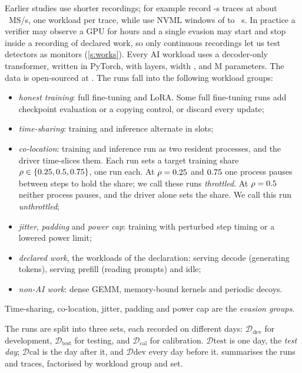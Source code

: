 Earlier studies use shorter recordings; for example \citet{gargiulo2026} record \GkTraceS{}-s traces
at about \GkRateApprox{}~MS/s, one workload per trace, while \citet{rahman2026} use NVML
windows of \RtWinLo{} to \RtWinHi{}~s. In practice a verifier may observe a GPU for hours and a single evasion may start and stop inside a recording of declared work, so only continuous recordings let us test detectors as monitors
(\cref{s:works}). Every AI workload uses a decoder-only transformer, written in PyTorch, with \ModelLayers{} layers, width
\ModelWidth, and \ModelParams{}M parameters. The data is open-sourced at \citet{kimpson2026corpus}. The runs fall into the following workload groups:
\begin{itemize}
  \item \emph{honest training}: full fine-tuning and LoRA. Some full fine-tuning runs add
        checkpoint evaluation or a copying control, or discard every update;
  \item \emph{time-sharing}: training and inference alternate in slots;
  \item \emph{co-location}: training and inference run as two resident processes,
        and the driver time-slices them. Each run sets a target training share
        $\rho \in \{0.25, 0.5, 0.75\}$, one run each. At $\rho = 0.25$
        and $0.75$ one process pauses between steps to hold the share; we call
        these runs \emph{throttled}. At
        $\rho = 0.5$ neither process pauses, and the driver alone sets the share.
        We call this run \emph{unthrottled};
  \item \emph{jitter}, \emph{padding} and \emph{power cap}: training with
        perturbed step timing or a lowered power limit;
  \item \emph{declared work}, the workloads of the declaration: serving decode
        (generating tokens), serving prefill (reading prompts) and idle;
  \item \emph{non-AI work}: dense GEMM, memory-bound kernels and periodic decoys.
\end{itemize}
Time-sharing, co-location, jitter, padding and power cap are the \emph{evasion groups}.

The runs are split into three sets, each recorded on different days: $\mathcal{D}_{\mathrm{dev}}$ for development, $\mathcal{D}_{\mathrm{test}}$ for testing, and $\mathcal{D}_{\mathrm{cal}}$ for calibration. $\mathcal{D}{\mathrm{test}}$ is one day, the \emph{test day}; $\mathcal{D}{\mathrm{cal}}$ is the day after it, and $\mathcal{D}{\mathrm{dev}}$ every day before it.  summarises the runs and traces, factorised by workload group and set.

